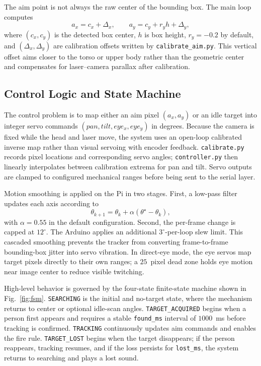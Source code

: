 \documentclass[lettersize,journal]{IEEEtran}
\begin{document}
The aim point is not always the raw center of the bounding box. The main loop computes
\[
    a_x = c_x + \Delta_x,\qquad
    a_y = c_y + r_y h + \Delta_y ,
\]
where $(c_x,c_y)$ is the detected box center, $h$ is box height, $r_y=-0.2$ by default, and $(\Delta_x,\Delta_y)$ are calibration offsets written by \texttt{calibrate\_aim.py}. This vertical offset aims closer to the torso or upper body rather than the geometric center and compensates for laser--camera parallax after calibration.

\subsection{Control Logic and State Machine}
\label{sec:method:control}
The control problem is to map either an aim pixel $(a_x,a_y)$ or an idle target into integer servo commands $(pan,tilt,eye_x,eye_y)$ in degrees. Because the camera is fixed while the head and laser move, the system uses an open-loop calibrated inverse map rather than visual servoing with encoder feedback. \texttt{calibrate.py} records pixel locations and corresponding servo angles; \texttt{controller.py} then linearly interpolates between calibration extrema for pan and tilt. Servo outputs are clamped to configured mechanical ranges before being sent to the serial layer.

Motion smoothing is applied on the Pi in two stages. First, a low-pass filter updates each axis according to
\[
    \theta_{k+1} = \theta_k + \alpha(\theta^\star - \theta_k),
\]
with $\alpha=0.55$ in the default configuration. Second, the per-frame change is capped at $12^\circ$. The Arduino applies an additional $3^\circ$-per-loop slew limit. This cascaded smoothing prevents the tracker from converting frame-to-frame bounding-box jitter into servo vibration. In direct-eye mode, the eye servos map target pixels directly to their own ranges; a $25$~pixel dead zone holds eye motion near image center to reduce visible twitching.

High-level behavior is governed by the four-state finite-state machine shown in Fig.~\ref{fig:fsm}. \texttt{SEARCHING} is the initial and no-target state, where the mechanism returns to center or optional idle-scan angles. \texttt{TARGET\_ACQUIRED} begins when a person first appears and requires a stable \texttt{found\_ms} interval of $1000$~ms before tracking is confirmed. \texttt{TRACKING} continuously updates aim commands and enables the fire rule. \texttt{TARGET\_LOST} begins when the target disappears; if the person reappears, tracking resumes, and if the loss persists for \texttt{lost\_ms}, the system returns to searching and plays a lost sound.
\end{document}
